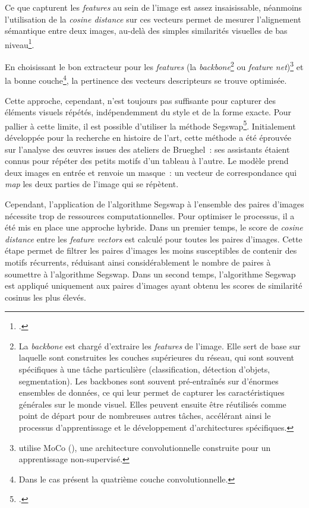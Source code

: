 Ce que capturent les \emph{features} au sein de l'image est assez
insaisissable, néanmoins l'utilisation de la \emph{cosine distance} sur
ces vecteurs permet de mesurer l'alignement sémantique entre deux
images, au-delà des simples similarités visuelles de bas
niveau\footcite{farley_multimodal_2024}.

En choisissant le bon extracteur pour les \emph{features} (la
\emph{backbone}\footnote{La \textit{backbone} est chargé d'extraire les \textit{features} de l'image. Elle sert de base sur laquelle sont construites les couches supérieures du réseau, qui sont souvent spécifiques à une tâche particulière (classification, détection d'objets, segmentation). Les backbones sont souvent pré-entraînés sur d'énormes ensembles de données, ce qui leur permet de capturer les caractéristiques générales sur le monde visuel. Elles peuvent ensuite être réutilisés comme point de départ pour de nombreuses autres tâches, accélérant ainsi le processus d'apprentissage et le développement d'architectures spécifiques.} ou \emph{feature net})\footnote{\eida
  utilise MoCo (\cite{he_momentum_2020}), une architecture
  convolutionnelle construite pour un apprentissage non-supervisé.} et la bonne couche\footnote{Dans le cas présent la
  quatrième couche convolutionnelle.}, la pertinence des vecteurs
descripteurs se trouve optimisée.

Cette approche, cependant, n'est toujours pas suffisante pour capturer
des éléments visuels répétés, indépendemment du style et de la forme
exacte. Pour pallier à cette limite, il est possible d'utiliser la méthode Segswap\footcite{shen_learning_2022}. Initialement
développée pour la recherche en histoire de l'art, cette méthode a été
éprouvée sur l'analyse des œuvres issues des ateliers de Brueghel~: ses
assistants étaient connus pour répéter des petits motifs d'un tableau à
l'autre. Le modèle prend deux images en entrée et renvoie un masque~: un
vecteur de correspondance qui \emph{map} les deux parties de l'image qui
se répètent.

Cependant, l'application de l'algorithme Segswap à l'ensemble des paires
d'images nécessite trop de ressources computationnelles. Pour optimiser
le processus, il a été mis en place une approche hybride. Dans un
premier temps, le score de \emph{cosine distance} entre les
\emph{feature vectors} est calculé pour toutes les paires d'images.
Cette étape permet de filtrer les paires d'images les moins susceptibles
de contenir des motifs récurrents, réduisant ainsi considérablement le
nombre de paires à soumettre à l'algorithme Segswap. Dans un second
temps, l'algorithme Segswap est appliqué uniquement aux paires d'images
ayant obtenu les scores de similarité cosinus les plus élevés.

